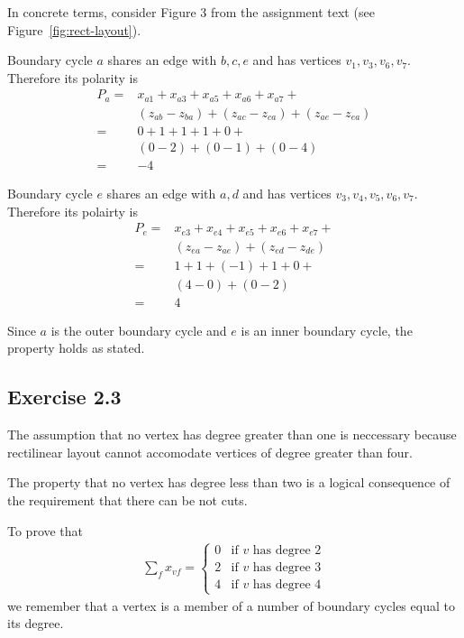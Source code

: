 In concrete terms, consider Figure 3 from the assignment text (see Figure~\ref{fig:rect-layout}).

Boundary cycle $a$ shares an edge with $b, c, e$ and has vertices $v_1, v_3, v_6, v_7$. Therefore
its polarity is
\begin{align*}
  P_a = &x_{a1} + x_{a3} + x_{a5} + x_{a6} + x_{a7} + \\
        &(z_{ab} - z_{ba}) + (z_{ac} - z_{ca}) + (z_{ae} - z_{ea}) \\
      = & 0 + 1 + 1 + 1 + 0 + \\
        & (0 - 2) + (0 - 1) + (0 - 4) \\
      = & -4
\end{align*}

Boundary cycle $e$ shares an edge with $a, d$ and has vertices $v_3, v_4, v_5, v_6, v_7$. Therefore
its polairty is
\begin{align*}
  P_e = &x_{e3} + x_{e4} + x_{e5} + x_{e6} + x_{e7} + \\
        &(z_{ea} - z_{ae}) + (z_{ed} - z_{de}) \\
      = & 1 + 1 + (-1) + 1 + 0 + \\
        & (4 - 0) + (0 - 2) \\
      = & 4
\end{align*}

Since $a$ is the outer boundary cycle and $e$ is an inner boundary cycle, the property holds as stated.

\subsection{Exercise 2.3}

The assumption that no vertex has degree greater than one is neccessary because
rectilinear layout cannot accomodate vertices of degree greater than four.

The property that no vertex has degree less than two is a logical consequence of
the requirement that there can be not cuts.

To prove that
\begin{align*}
  \sum_f x_{vf} = \begin{cases}
    0 & \text{if $v$ has degree $2$} \\
    2 & \text{if $v$ has degree $3$} \\
    4 & \text{if $v$ has degree $4$}
  \end{cases}
\end{align*}
we remember that a vertex is a member of a number of boundary cycles equal to
its degree.

